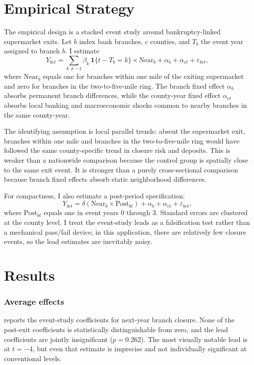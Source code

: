 \documentclass[12pt]{article}
\begin{document}


\section{Empirical Strategy}

The empirical design is a stacked event study around bankruptcy-linked supermarket exits. Let \(b\) index bank branches, \(c\) counties, and \(T_b\) the event year assigned to branch \(b\). I estimate
\begin{equation}
Y_{bct} = \sum_{k \neq -1} \beta_k \, \mathbf{1}\{t - T_b = k\} \times \text{Near}_b + \alpha_b + \alpha_{ct} + \varepsilon_{bct},
\end{equation}
where \(\text{Near}_b\) equals one for branches within one mile of the exiting supermarket and zero for branches in the two-to-five-mile ring. The branch fixed effect \(\alpha_b\) absorbs permanent branch differences, while the county-year fixed effect \(\alpha_{ct}\) absorbs local banking and macroeconomic shocks common to nearby branches in the same county-year.

The identifying assumption is local parallel trends: absent the supermarket exit, branches within one mile and branches in the two-to-five-mile ring would have followed the same county-specific trend in closure risk and deposits. This is weaker than a nationwide comparison because the control group is spatially close to the same exit event. It is stronger than a purely cross-sectional comparison because branch fixed effects absorb static neighborhood differences.

For compactness, I also estimate a post-period specification:
\begin{equation}
Y_{bct} = \delta (\text{Near}_b \times \text{Post}_{bt}) + \alpha_b + \alpha_{ct} + \varepsilon_{bct},
\end{equation}
where \(\text{Post}_{bt}\) equals one in event years \(0\) through \(3\). Standard errors are clustered at the county level. I treat the event-study leads as a falsification test rather than a mechanical pass/fail device; in this application, there are relatively few closure events, so the lead estimates are inevitably noisy.

\section{Results}

\subsubsection*{Average effects}
 reports the event-study coefficients for next-year branch closure. None of the post-exit coefficients is statistically distinguishable from zero, and the lead coefficients are jointly insignificant (\(p = 0.262\)). The most visually notable lead is at \(t=-4\), but even that estimate is imprecise and not individually significant at conventional levels.
\end{document}
